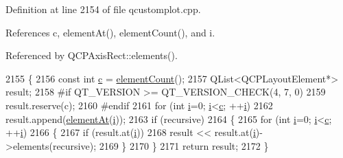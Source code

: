 Definition at line 2154 of file qcustomplot.\+cpp.



References c, element\+At(), element\+Count(), and i.



Referenced by Q\+C\+P\+Axis\+Rect\+::elements().


\begin{DoxyCode}
2155 \{
2156   \textcolor{keyword}{const} \textcolor{keywordtype}{int} \hyperlink{_comparision_pictures_2_createtest_image_8m_ae0323a9039add2978bf5b49550572c7c}{c} = \hyperlink{class_q_c_p_layout_a39d3e9ef5d9b82ab1885ba1cb9597e56}{elementCount}();
2157   QList<QCPLayoutElement*> result;
2158 \textcolor{preprocessor}{#if QT\_VERSION >= QT\_VERSION\_CHECK(4, 7, 0)}
2159   result.reserve(c);
2160 \textcolor{preprocessor}{#endif}
2161   \textcolor{keywordflow}{for} (\textcolor{keywordtype}{int} \hyperlink{_comparision_pictures_2_createtest_image_8m_a6f6ccfcf58b31cb6412107d9d5281426}{i}=0; \hyperlink{_comparision_pictures_2_createtest_image_8m_a6f6ccfcf58b31cb6412107d9d5281426}{i}<\hyperlink{_comparision_pictures_2_createtest_image_8m_ae0323a9039add2978bf5b49550572c7c}{c}; ++\hyperlink{_comparision_pictures_2_createtest_image_8m_a6f6ccfcf58b31cb6412107d9d5281426}{i})
2162     result.append(\hyperlink{class_q_c_p_layout_afa73ca7d859f8a3ee5c73c9b353d2a56}{elementAt}(\hyperlink{_comparision_pictures_2_createtest_image_8m_a6f6ccfcf58b31cb6412107d9d5281426}{i}));
2163   \textcolor{keywordflow}{if} (recursive)
2164   \{
2165     \textcolor{keywordflow}{for} (\textcolor{keywordtype}{int} \hyperlink{_comparision_pictures_2_createtest_image_8m_a6f6ccfcf58b31cb6412107d9d5281426}{i}=0; \hyperlink{_comparision_pictures_2_createtest_image_8m_a6f6ccfcf58b31cb6412107d9d5281426}{i}<\hyperlink{_comparision_pictures_2_createtest_image_8m_ae0323a9039add2978bf5b49550572c7c}{c}; ++\hyperlink{_comparision_pictures_2_createtest_image_8m_a6f6ccfcf58b31cb6412107d9d5281426}{i})
2166     \{
2167       \textcolor{keywordflow}{if} (result.at(\hyperlink{_comparision_pictures_2_createtest_image_8m_a6f6ccfcf58b31cb6412107d9d5281426}{i}))
2168         result << result.at(\hyperlink{_comparision_pictures_2_createtest_image_8m_a6f6ccfcf58b31cb6412107d9d5281426}{i})->elements(recursive);
2169     \}
2170   \}
2171   \textcolor{keywordflow}{return} result;
2172 \}
\end{DoxyCode}


